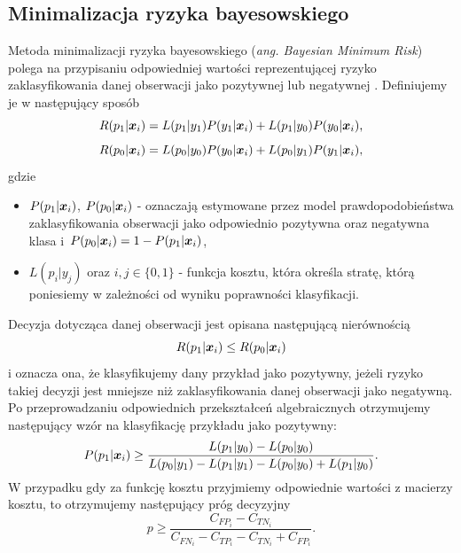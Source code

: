 \documentclass[inzynierska]{pwr_wmat_praca_dyplomowa}
\theoremstyle{plain}
\numberwithin{theorem}{chapter}
\theoremstyle{definition}
\numberwithin{theorem}{chapter}
\begin{document}
\subsection{Minimalizacja ryzyka bayesowskiego}
Metoda minimalizacji ryzyka bayesowskiego (\textit{ang. Bayesian Minimum Risk}) polega na przypisaniu odpowiedniej wartości reprezentującej ryzyko zaklasyfikowania danej obserwacji jako pozytywnej lub negatywnej \cite{CSCCFD}. Definiujemy je w następujący sposób
$$ R(p_1|\boldsymbol{x}_{i}) = L(p_1|y_1)P(y_1|\boldsymbol{x}_{i}) + L(p_1|y_0)P(y_0|\boldsymbol{x}_{i}) \text{,}$$
$$ R(p_0|\boldsymbol{x}_{i}) = L(p_0|y_0)P(y_0|\boldsymbol{x}_{i}) + L(p_0|y_1)P(y_1|\boldsymbol{x}_{i}) \text{,}$$
gdzie
\begin{itemize}
	\item $P(p_1|\boldsymbol{x}_{i})$, $P(p_0|\boldsymbol{x}_{i})$ - oznaczają estymowane przez model prawdopodobieństwa zaklasyfikowania obserwacji jako odpowiednio pozytywna oraz negatywna klasa i~$P(p_0|\boldsymbol{x}_{i}) = 1 - P(p_1|\boldsymbol{x}_{i})$,
	\item $L(p_{i}|y_{j})$ oraz $i,j \in \{0, 1\}$ - funkcja kosztu, która określa stratę, którą poniesiemy w zależności od wyniku poprawności klasyfikacji.
\end{itemize}{}
Decyzja dotycząca danej obserwacji jest opisana następującą nierównością
$$ R(p_1|\boldsymbol{x}_{i}) \leq R(p_0|\boldsymbol{x}_{i})$$
i oznacza ona, że klasyfikujemy dany przykład jako pozytywny, jeżeli ryzyko takiej decyzji jest mniejsze niż zaklasyfikowania danej obserwacji jako negatywną. 
Po przeprowadzaniu odpowiednich przekształceń algebraicznych otrzymujemy następujący wzór na klasyfikację przykładu jako pozytywny:
$$ P(p_1|\boldsymbol{x}_{i}) \ge \frac{L(p_1|y_0) - L(p_0|y_0)}{L(p_0|y_1) - L(p_1|y_1) - L(p_0|y_0) + L(p_1|y_0)} \text{.}$$
W przypadku gdy za funkcję kosztu przyjmiemy odpowiednie wartości z macierzy kosztu, to otrzymujemy następujący próg decyzyjny
$$ p \ge \frac{C_{FP_i} - C_{TN_i}}{C_{FN_i} - C_{TP_i} - C_{TN_i} + C_{FP_i}} \text{.}$$
\end{document}
